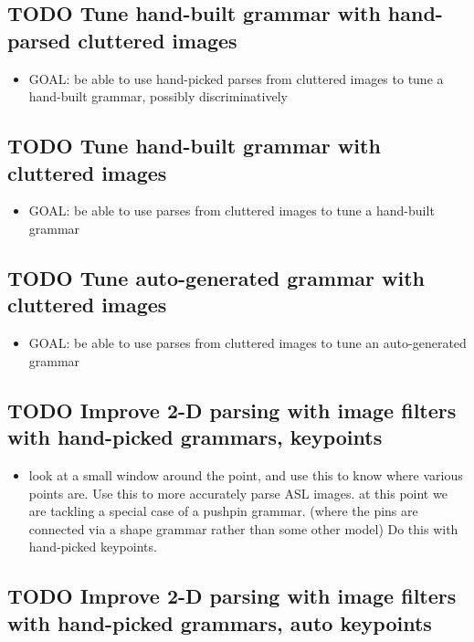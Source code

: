 \documentclass{book}
\begin{document}
\subsection{\textbf{TODO} Tune hand-built grammar with hand-parsed cluttered images}
\label{sec-7_27_5}

\begin{itemize}
\item GOAL: be able to use hand-picked parses from cluttered images to
    tune a hand-built grammar, possibly discriminatively
\end{itemize}
\subsection{\textbf{TODO} Tune hand-built grammar with cluttered images}
\label{sec-7_27_6}

\begin{itemize}
\item GOAL: be able to use parses from cluttered images to tune a
    hand-built grammar
\end{itemize}
\subsection{\textbf{TODO} Tune auto-generated grammar with cluttered images}
\label{sec-7_27_7}

\begin{itemize}
\item GOAL: be able to use parses from cluttered images to tune an
    auto-generated grammar
\end{itemize}
\subsection{\textbf{TODO} Improve 2-D parsing with image filters with hand-picked grammars, keypoints}
\label{sec-7_27_8}

\begin{itemize}
\item look at a small window around the point, and use this to know
    where various points are. Use this to more accurately parse ASL
    images. at this point we are tackling a special case of a pushpin
    grammar. (where the pins are connected via a shape grammar rather
    than some other model) Do this with hand-picked keypoints.
\end{itemize}
\subsection{\textbf{TODO} Improve 2-D parsing with image filters with hand-picked grammars, auto keypoints}
\label{sec-7_27_9}
\end{document}
